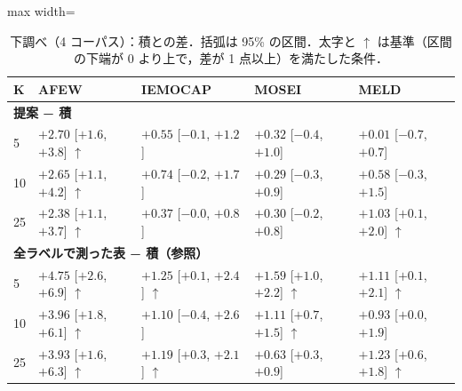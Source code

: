 \begin{table}[H]\centering\small
\caption{下調べ（4 コーパス）：積との差．括弧は 95\% の区間．太字と $\uparrow$ は基準（区間の下端が 0 より上で，差が 1 点以上）を満たした条件．}
\setlength{\tabcolsep}{5pt}
\begin{adjustbox}{max width=\linewidth}
\begin{tabular}{lllll}
\toprule
K & AFEW & IEMOCAP & MOSEI & MELD \\
\midrule
\multicolumn{5}{l}{\textbf{提案 − 積}} \\
5 & \textbf{$+2.70$} {\scriptsize[$+1.6$, $+3.8$]} $\uparrow$ & $+0.55$ {\scriptsize[$-0.1$, $+1.2$]} & $+0.32$ {\scriptsize[$-0.4$, $+1.0$]} & $+0.01$ {\scriptsize[$-0.7$, $+0.7$]} \\
10 & \textbf{$+2.65$} {\scriptsize[$+1.1$, $+4.2$]} $\uparrow$ & $+0.74$ {\scriptsize[$-0.2$, $+1.7$]} & $+0.29$ {\scriptsize[$-0.3$, $+0.9$]} & $+0.58$ {\scriptsize[$-0.3$, $+1.5$]} \\
25 & \textbf{$+2.38$} {\scriptsize[$+1.1$, $+3.7$]} $\uparrow$ & $+0.37$ {\scriptsize[$-0.0$, $+0.8$]} & $+0.30$ {\scriptsize[$-0.2$, $+0.8$]} & \textbf{$+1.03$} {\scriptsize[$+0.1$, $+2.0$]} $\uparrow$ \\
\midrule
\multicolumn{5}{l}{\textbf{全ラベルで測った表 − 積（参照）}} \\
5 & \textbf{$+4.75$} {\scriptsize[$+2.6$, $+6.9$]} $\uparrow$ & \textbf{$+1.25$} {\scriptsize[$+0.1$, $+2.4$]} $\uparrow$ & \textbf{$+1.59$} {\scriptsize[$+1.0$, $+2.2$]} $\uparrow$ & \textbf{$+1.11$} {\scriptsize[$+0.1$, $+2.1$]} $\uparrow$ \\
10 & \textbf{$+3.96$} {\scriptsize[$+1.8$, $+6.1$]} $\uparrow$ & $+1.10$ {\scriptsize[$-0.4$, $+2.6$]} & \textbf{$+1.11$} {\scriptsize[$+0.7$, $+1.5$]} $\uparrow$ & $+0.93$ {\scriptsize[$+0.0$, $+1.9$]} \\
25 & \textbf{$+3.93$} {\scriptsize[$+1.6$, $+6.3$]} $\uparrow$ & \textbf{$+1.19$} {\scriptsize[$+0.3$, $+2.1$]} $\uparrow$ & $+0.63$ {\scriptsize[$+0.3$, $+0.9$]} & \textbf{$+1.23$} {\scriptsize[$+0.6$, $+1.8$]} $\uparrow$ \\
\bottomrule
\end{tabular}
\end{adjustbox}
\end{table}

